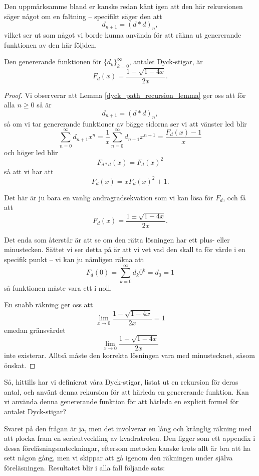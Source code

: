 \documentclass[nobib]{tufte-handout}
\begin{document}
Den uppmärksamme bland er kanske redan känt igen att den här rekursionen säger något om en faltning -- specifikt säger den att
$$d_{n+1} = (d * d)_n,$$
vilket ser ut som något vi borde kunna använda för att räkna ut genererande funktionen av den här följden.

\begin{proposition}
    Den genererande funktionen för $\{d_k\}_{k=0}^\infty$, antalet Dyck-stigar, är
    $$F_d(x) = \frac{1 - \sqrt{1 - 4x}}{2x}.$$

    \begin{proof}
        Vi observerar att Lemma \ref{dyck_path_recursion_lemma} ger oss att för alla $n \geq 0$ så är
        $$d_{n+1} = (d*d)_n,$$
        så om vi tar genererande funktioner av bägge sidorna ser vi att vänster led blir
        $$\sum_{n=0}^{\infty}d_{n+1}x^n = \frac{1}{x}\sum_{n=0}^{\infty} d_{n+1} x^{n+1} = \frac{F_d(x) - 1}{x}$$
        och höger led blir
        $$F_{d * d}(x) = F_d(x)^2$$
        så att vi har att
        $$F_d(x) = x F_d(x)^2 + 1.$$

        Det här är ju bara en vanlig andragradsekvation som vi kan lösa för $F_d$, och få att
        $$F_d(x) = \frac{1 \pm \sqrt{1 - 4x}}{2x}.$$

        Det enda som återstår är att se om den rätta lösningen har ett plus- eller minustecken. Sättet vi ser detta på är att vi vet vad den skall ta för värde i en specifik punkt -- vi kan ju nämligen räkna att
        $$F_d(0) = \sum_{k=0}^{\infty} d_k 0^k = d_0 = 1$$
        så funktionen måste vara ett i noll.

        En snabb räkning ger oss att
        $$\lim_{x \to 0} \frac{1 - \sqrt{1 - 4x}}{2x} = 1$$
        emedan gränsvärdet
        $$\lim_{x \to 0} \frac{1 + \sqrt{1 - 4x}}{2x}$$
        inte existerar. Alltså måste den korrekta lösningen vara med minustecknet, såsom önskat.
    \end{proof}
\end{proposition}

Så, hittills har vi definierat våra Dyck-stigar, listat ut en rekursion för deras antal, och använt denna rekursion för att härleda en genererande funktion. Kan vi använda denna genererande funktion för att härleda en explicit formel för antalet Dyck-stigar?

Svaret på den frågan är ja, men det involverar en lång och krånglig räkning med att plocka fram en serieutveckling av kvadratroten. Den ligger som ett appendix i dessa föreläsningsanteckningar, eftersom metoden kanske trots allt är bra att ha sett någon gång, men vi skippar att gå igenom den räkningen under själva föreläsningen. Resultatet blir i alla fall följande sats:
\end{document}
